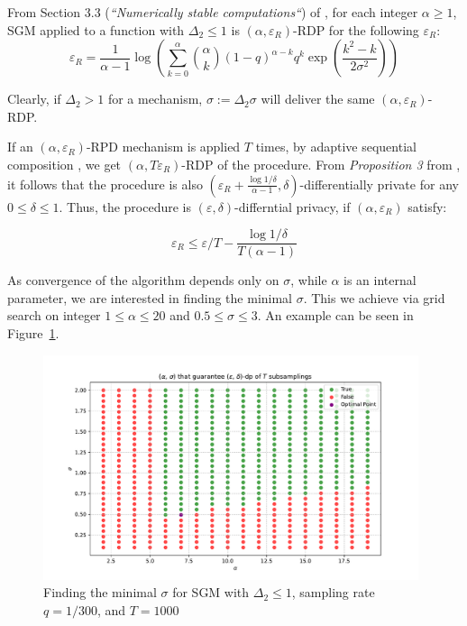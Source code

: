 \documentclass[12pt]{article}
\newcommand{\eps}{\varepsilon}
\begin{document}
From Section 3.3 (\textit{``Numerically stable computations``}) of \cite{mironov2019SGM}, for each integer $\alpha \geq 1$, SGM applied to a function with $\Delta_2\leq1$ is $(\alpha, \eps_R)$-RDP for the following $\eps_R$:
\begin{equation}\label{eq:renyi_eps_guarantee}
\eps_R = \frac{1}{\alpha - 1} \log\left(\sum_{k=0}^{\alpha} {\alpha \choose k}  (1-q)^{\alpha-k}q^{k} \exp\left(\frac{k^2 - k}{2\sigma^2}\right)\right)
\end{equation}

Clearly, if $\Delta_2 > 1$ for a mechanism, $\sigma := \Delta_2 \sigma$ will deliver the same $(\alpha, \eps_R)$-RDP.

If an $(\alpha, \eps_R)$-RPD mechanism is applied $T$ times, by adaptive sequential composition \cite{Mironov2017}, we get $(\alpha, T\eps_R)$-RDP of the procedure. From \textit{Proposition 3} from \cite{Mironov2017}, it follows that the procedure is also $(\eps_R + \frac{\log1/\delta}{\alpha - 1}, \delta)$-differentially private for any $0 \leq \delta \leq 1$. Thus, the procedure is $(\eps, \delta)$-differntial privacy, if $(\alpha, \eps_R)$ satisfy:

\begin{equation}\label{eq:renyi_eps_requirement}
\eps_R \leq \eps/T - \frac{\log 1/\delta}{T(\alpha - 1)}
\end{equation}

As convergence of the algorithm depends only on $\sigma$, while $\alpha$ is an internal parameter, we are interested in finding the minimal $\sigma$. This we achieve via grid search on integer $1\leq \alpha \leq 20$ and $0.5 \leq \sigma \leq 3$. An example can be seen in Figure~\ref{fig:grid_sigma}.
\begin{figure}[h]
    \centering
    \includegraphics[width=0.98\textwidth]{../figs/valid_sigma.pdf}
    \caption{Finding the minimal $\sigma$ for SGM with $\Delta_2 \leq 1$, sampling rate $q = 1/300$, and $T = 1000$}
    \label{fig:grid_sigma}
\end{figure}
\end{document}
